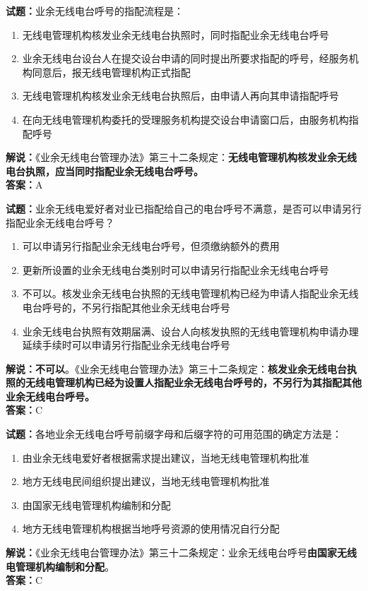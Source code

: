 \documentclass{ctexbook}
\begin{document}
\bigskip


\noindent\textbf{试题：}业余无线电台呼号的指配流程是：
\begin{enumerate}[leftmargin=3em]
	\item 无线电管理机构核发业余无线电台执照时，同时指配业余无线电台呼号
	\item 业余无线电台设台人在提交设台申请的同时提出所要求指配的呼号，经服务机构同意后，报无线电管理机构正式指配
	\item 无线电管理机构核发业余无线电台执照后，由申请人再向其申请指配呼号
	\item 在向无线电管理机构委托的受理服务机构提交设台申请窗口后，由服务机构指配呼号
\end{enumerate}
\noindent\textbf{解说：}《业余无线电台管理办法》第三十二条规定：\textbf{无线电管理机构核发业余无线电台执照，应当同时指配业余无线电台呼号。}\\\noindent\textbf{答案：}A



\bigskip


\noindent\textbf{试题：}业余无线电爱好者对业已指配给自己的电台呼号不满意，是否可以申请另行指配业余无线电台呼号？
\begin{enumerate}[leftmargin=3em]
	\item 可以申请另行指配业余无线电台呼号，但须缴纳额外的费用
	\item 更新所设置的业余无线电台类别时可以申请另行指配业余无线电台呼号
	\item 不可以。核发业余无线电台执照的无线电管理机构已经为申请人指配业余无线电台呼号的，不另行指配其他业余无线电台呼号
	\item 业余无线电台执照有效期届满、设台人向核发执照的无线电管理机构申请办理延续手续时可以申请另行指配业余无线电台呼号
\end{enumerate}
\textbf{解说：不可以}。《业余无线电台管理办法》第三十二条规定：\textbf{核发业余无线电台执照的无线电管理机构已经为设置人指配业余无线电台呼号的，不另行为其指配其他业余无线电台呼号。}\\\noindent\textbf{答案：}C


\bigskip


\noindent\textbf{试题：}各地业余无线电台呼号前缀字母和后缀字符的可用范围的确定方法是：
\begin{enumerate}[leftmargin=3em]
	\item 由业余无线电爱好者根据需求提出建议，当地无线电管理机构批准
	\item 地方无线电民间组织提出建议，当地无线电管理机构批准
	\item 由国家无线电管理机构编制和分配
	\item 地方无线电管理机构根据当地呼号资源的使用情况自行分配
\end{enumerate}
\noindent\textbf{解说：}《业余无线电台管理办法》第三十二条规定：业余无线电台呼号\textbf{由国家无线电管理机构编制和分配}。\\\noindent\textbf{答案：}C
\end{document}
